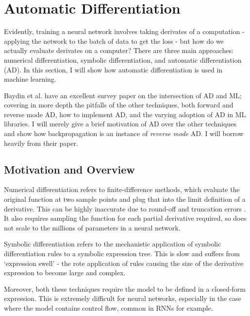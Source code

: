 \section{Automatic Differentiation}
Evidently, training a neural network involves taking derivates of a computation - applying the network to the batch of data to get the loss -
but how do we actually evaluate derivates on a computer?
There are three main approaches: numerical differentiation, symbolic differentiation, and automatic differentiation (AD).
In this section, I will show how automatic differentiation is used in machine learning.

Baydin et al. \cite{Baydin2015} have an excellent survey paper on the intersection of AD and ML;
covering in more depth the pitfalls of the other techniques, both forward and reverse mode AD, how to implement AD, and the varying adoption of AD in ML libraries.
I will merely give a brief motivation of AD over the other techniques and show how backpropagation is an instance of \textit{reverse mode} AD.
I will borrow heavily from their paper.

\subsection{Motivation and Overview}
Numerical differentiation refers to finite-difference methods, which evaluate the original function at two sample points and plug that into the limit definition of a derivative.
This can be highly inaccurate due to round-off and truncation errors \cite{Jerrell1997}.
It also requires sampling the function for each partial derivative required, so does not scale to the millions of parameters in a neural network.

Symbolic differentiation refers to the mechanistic application of symbolic differentiation rules to a symbolic expression tree.
This is slow and suffers from `expression swell' \cite{Juedes1991} - the rote application of rules causing the size of the derivative expression to become large and complex.

Moreover, both these techniques require the model to be defined in a closed-form expression.
This is extremely difficult for neural networks, especially in the case where the model contains control flow, common in RNNs for example.

